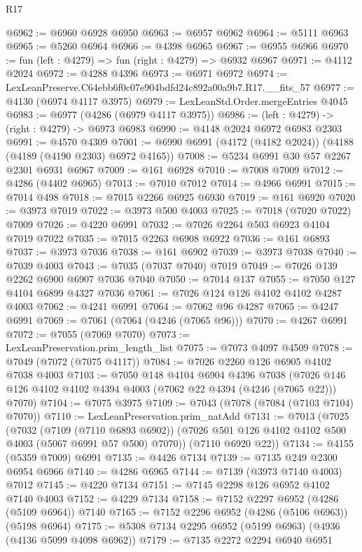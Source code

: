 \begin{lexlean}{R17}
\begin{coremodule}
@6962 := @6960 @6928 @6950
@6963 := @6957 @6962
@6964 := @5111 @6963
@6965 := @5260 @6964
@6966 := @4398 @6965
@6967 := @6955 @6966
@6970 := fun (left : @4279) => fun (right : @4279) => @6932 @6967
@6971 := @4112 @2024
@6972 := @4288 @4396
@6973 := @6971 @6972
@6974 := LexLeanPreserve.C64ebb6f0c07e904bdfd24c892a00a9b7.R17.__fits_57
@6977 := @4130 (@6974 @4117 @3975)
@6979 := LexLeanStd.Order.mergeEntries @4045
@6983 := @6977 (@4286 (@6979 @4117 @3975))
@6986 := (left : @4279) -> (right : @4279) -> @6973 @6983
@6990 := @4148 @2024 @6972 @6983 @2303
@6991 := @4570 @4309
@7001 := @6990 @6991 (@4172 (@4182 @2024)) (@4188 (@4189 (@4190 @2303) @6972 @4165))
@7008 := @5234 @6991 @30 @57 @2267 @2301 @6931 @6967
@7009 := @161 @6928
@7010 := @7008 @7009
@7012 := @4286 (@4402 @6965)
@7013 := @7010 @7012
@7014 := @4966 @6991
@7015 := @7014 @498
@7018 := @7015 @2266 @6925 @6930
@7019 := @161 @6920
@7020 := @3973 @7019
@7022 := @3973 @500 @4003
@7025 := @7018 (@7020 @7022) @7009
@7026 := @4220 @6991
@7032 := @7026 @2264 @503 @6923 @4104 @7019 @7022
@7035 := @7015 @2263 @6908 @6922
@7036 := @161 @6893
@7037 := @3973 @7036
@7038 := @161 @6902
@7039 := @3973 @7038
@7040 := @7039 @4003
@7043 := @7035 (@7037 @7040) @7019
@7049 := @7026 @139 @2262 @6900 @6907 @7036 @7040
@7050 := @7014 @137
@7055 := @7050 @127 @4104 @6899 @4327 @7036
@7061 := @7026 @124 @126 @4102 @4102 @4287 @4003
@7062 := @4241 @6991
@7064 := @7062 @96 @4287
@7065 := @4247 @6991
@7069 := @7061 (@7064 (@4246 (@7065 @96)))
@7070 := @4267 @6991
@7072 := @7055 (@7069 @7070)
@7073 := LexLeanPreservation.prim_length_list
@7075 := @7073 @4097 @4509
@7078 := @7049 (@7072 (@7075 @4117))
@7084 := @7026 @2260 @126 @6905 @4102 @7038 @4003
@7103 := @7050
    @148
    @4104
    @6904
    @4396
    @7038
    (@7026 @146 @126 @4102 @4102 @4394 @4003 (@7062 @22 @4394 (@4246 (@7065 @22))) @7070)
@7104 := @7075 @3975
@7109 := @7043 (@7078 (@7084 (@7103 @7104) @7070))
@7110 := LexLeanPreservation.prim_natAdd
@7131 := @7013
    (@7025
      (@7032
        (@7109 (@7110 @6893 @6902))
        (@7026 @501 @126 @4102 @4102 @500 @4003 (@5067 @6991 @57 @500) @7070))
      (@7110 @6920 @22))
@7134 := @4155 (@5359 @7009) @6991
@7135 := @4426 @7134
@7139 := @7135 @249 @2300 @6954 @6966
@7140 := @4286 @6965
@7144 := @7139 (@3973 @7140 @4003) @7012
@7145 := @4220 @7134
@7151 := @7145 @2298 @126 @6952 @4102 @7140 @4003
@7152 := @4229 @7134
@7158 := @7152 @2297 @6952 (@4286 (@5109 @6964)) @7140
@7165 := @7152 @2296 @6952 (@4286 (@5106 @6963)) (@5198 @6964)
@7175 := @5308 @7134 @2295 @6952 (@5199 @6963) (@4936 (@4136 @5099 @4098 @6962))
@7179 := @7135 @2272 @2294 @6940 @6951

\end{coremodule}
\end{lexlean}
